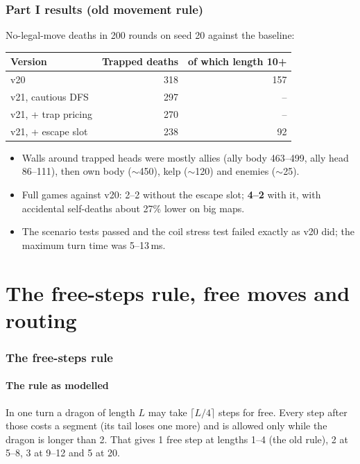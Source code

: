 \documentclass[11pt,a4paper]{article}
\begin{document}
\section{Part I results (old movement rule)}
No-legal-move deaths in 200 rounds on seed 20 against the baseline:
\begin{center}
\begin{tabular}{@{}lrr@{}}
\toprule
Version & Trapped deaths & of which length 10+ \\
\midrule
v20 & 318 & 157 \\
v21, cautious DFS & 297 & -- \\
v21, + trap pricing & 270 & -- \\
v21, + escape slot & 238 & 92 \\
\bottomrule
\end{tabular}
\end{center}
\begin{itemize}
  \item Walls around trapped heads were mostly allies (ally body 463--499, ally head 86--111), then own body ($\sim$450),
        kelp ($\sim$120) and enemies ($\sim$25).
  \item Full games against v20: 2--2 without the escape slot; \textbf{4--2} with it, with accidental self-deaths about
        27\% lower on big maps.
  \item The scenario tests passed and the coil stress test failed exactly as v20 did; the maximum turn time was 5--13\,ms.
\end{itemize}

\part{The free-steps rule, free moves and routing}
\section{The free-steps rule}\label{sec:rule}
\subsection{The rule as modelled}
In one turn a dragon of length $L$ may take $\lceil L/4\rceil$ steps for free. Every step after those costs a segment
(its tail loses one more) and is allowed only while the dragon is longer than 2. That gives 1 free step at lengths 1--4
(the old rule), 2 at 5--8, 3 at 9--12 and 5 at 20.
\end{document}
